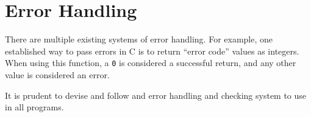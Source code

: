\documentclass[StyleGuide.tex]{subfiles}
\begin{document}
\chapter{Error Handling}\label{error-handling}

There are multiple existing systems of error handling. For example, one
established way to pass errors in C is to return ``error code'' values
as integers. When using this function, a \texttt{0} is considered a successful
return, and any other value is considered an error.

It is prudent to devise and follow and error handling and checking
system to use in all programs.
\end{document}
